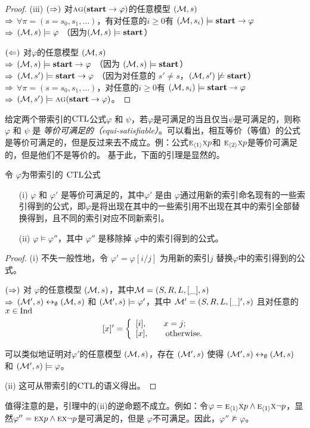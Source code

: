 \begin{proof}
	(iii) $(\Rightarrow)$ 对$\textsc{a}\textsc{g} (\textbf{start} \rightarrow\varphi)$的任意模型 $({\cal M},s)$ \\
	$\Rightarrow$ $\forall \pi=(s=s_0, s_1, \dots)$，有对任意的$i\geq 0$有 $({\cal M},s_i) \models \textbf{start} \rightarrow\varphi$\\
	$\Rightarrow$ $({\cal M},s) \models \varphi$ （因为$({\cal M},s) \models \textbf{start}$）
	
	$(\Leftarrow)$ 对$\varphi$的任意模型 $({\cal M}, s)$\\
	$\Rightarrow$ $({\cal M},s) \models \textbf{start}\rightarrow \varphi$ （因为 $({\cal M},s) \models \textbf{start}$）\\
	$\Rightarrow$ $({\cal M},s') \models \textbf{start}\rightarrow \varphi$ （因为对任意的 $s'\not = s$，$({\cal M},s') \not \models \textbf{start}$）\\
	$\Rightarrow$ $\forall \pi=(s=s_0, s_1, \dots)$，对任意的$i\geq 0$有 $({\cal M},s_i) \models \textbf{start} \rightarrow\varphi$ \\ 
	$\Rightarrow$ $({\cal M},s') \models \textsc{a}\textsc{g} (\textbf{start} \rightarrow\varphi)$。
\end{proof}

给定两个带索引的$\textrm{CTL}$公式$\varphi$ 和 $\psi$，若$\varphi$是可满足的当且仅当$\psi$是可满足的，则称 $\varphi$ 和 $\psi$ 是 {\em 等价可满足的（equi-satisfiable）}。可以看出，相互等价（等值）的公式是等价可满足的，但是反过来去不成立。例：公式$\textsc{e}_{{\langle{1}\rangle}}\textsc{x} p$和
 $\textsc{e}_{{\langle{2}\rangle}}\textsc{x} p$是等价可满足的，但是他们不是等价的。
基于此，下面的引理是显然的。
\begin{lemma}\label{lem:indno}
	令 $\varphi$为带索引的 $\textrm{CTL}$公式
	\begin{itemize}
		\item[(i)] $\varphi$ 和 $\varphi'$ 是等价可满足的，其中$\varphi'$ 是由 $\varphi$通过用新的索引命名现有的一些索引得到的公式，即$\varphi$是将出现在其中的一些索引用不出现在其中的索引全部替换得到，且不同的索引对应不同新索引。
		\item[(ii)] $\varphi\models\varphi''$，其中 $\varphi''$ 是移除掉 $\varphi$中的索引得到的公式。
	\end{itemize}
\end{lemma}
\begin{proof}
	(i) 不失一般性地，令 $\varphi'=\varphi[i/j]$ 为用新的索引$j$ 替换$\varphi$中的索引得到的公式。
	
	 $(\Rightarrow)$ 对 $\varphi$的任意模型 $({\cal M},s)$，其中${\cal M} = (S,R,L,[\_], s)$ \\
	 $\Rightarrow$ $({\cal M}',s) \leftrightarrow_{\emptyset} ({\cal M},s)$ 和 $({\cal M}',s) \models \varphi'$，其中 ${\cal M}' = (S,R,L,[\_]',s)$ 且对任意的 $x \in \textrm{Ind}$
	 \[[x]'=
	 \left\{
	 \begin{array}{ll}
	 	[i], \qquad \hbox{$x = j$;} \\
	 	{[x]}, \qquad \hbox{otherwise.}
	 \end{array}
	 \right.
	 \]
	 
	 可以类似地证明对$\varphi'$的任意模型 $({\cal M},s)$，存在 $({\cal M}',s)$ 使得  $({\cal M}',s) \leftrightarrow_{\emptyset} ({\cal M},s)$  和  $({\cal M}',s) \models \varphi$。
	 
	 (ii) 这可从带索引的$\textrm{CTL}$的语义得出。
\end{proof}
值得注意的是，引理中的(ii)的逆命题不成立。例如：令$\varphi=\textsc{e}_{{\langle{1}\rangle}}\textsc{x} p \land \textsc{e}_{{\langle{1}\rangle}}\textsc{x} \neg p$，显然$\varphi'' = \textsc{e}\textsc{x} p \land \textsc{e}\textsc{x} \neg p$是可满足的，但是 $\varphi$不可满足。因此，$\varphi''\not\models\varphi$。

